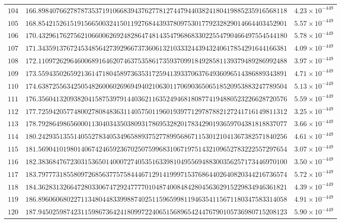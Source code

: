 \documentclass[12pt,reqno]{amsart}
\theoremstyle{remark}
\begin{document}
\begin{longtable}{clc}
$104$ & $166.8984076627878735371910668394376277812744794403824180419885235916568118$ & $4.23\times 10^{-449}$ \\
$105$ & $168.8542152615191566500324150119276844393780975301779232829014664403452901$ & $5.57\times 10^{-449}$ \\
$106$ & $170.4329617627562106600626924828647481435479686833022554790466497554544180$ & $5.78\times 10^{-449}$ \\
$107$ & $171.3435913767245348564273929667373606132103332443943240617854291644166381$ & $4.09\times 10^{-449}$ \\
$108$ & $172.1109726296460068916462074637535861735937099184928581139379489286992488$ & $3.97\times 10^{-449}$ \\
$109$ & $173.5594350265921361471804589736353172594139337063764936096514386889343891$ & $4.71\times 10^{-449}$ \\
$110$ & $174.6387255634250548260060269694940210630117069036506518520953883247789504$ & $5.13\times 10^{-449}$ \\
$111$ & $176.3560413209382041587539791440362116352494681808774194880523226628720576$ & $5.59\times 10^{-449}$ \\
$112$ & $177.7259420577480027808483631140575011960193977129787882127241716149811312$ & $3.25\times 10^{-449}$ \\
$113$ & $178.7928649865600011304034350380931786953282017834290193659704381818837077$ & $3.66\times 10^{-449}$ \\
$114$ & $180.2429351355140552783405349658893752778995686711530121041367382571840256$ & $4.61\times 10^{-449}$ \\
$115$ & $181.5690410198014067424659236702507599683106719751432109652783222557297654$ & $3.07\times 10^{-449}$ \\
$116$ & $182.3836847672303153650140007274053516339810495569488300356257173446970100$ & $3.50\times 10^{-449}$ \\
$117$ & $183.7977731855809726856377575844467129141999715376864402640820344216736574$ & $5.72\times 10^{-449}$ \\
$118$ & $184.3628313266472803306747292477770104874008484280456362915229834946361821$ & $4.39\times 10^{-449}$ \\
$119$ & $186.8960606802271134804483399887402511596599811946354115671180347583314058$ & $4.91\times 10^{-449}$ \\
$120$ & $187.9450259874231159867364241809972240651568965424476790105736980715208123$ & $5.90\times 10^{-449}$ \\

\end{longtable}
\end{document}

